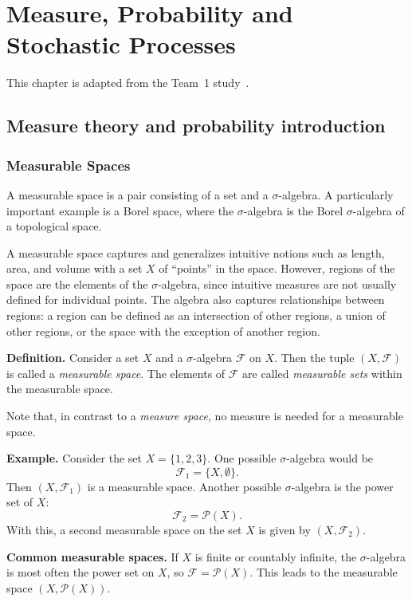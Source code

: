 \chapter{Measure, Probability and Stochastic Processes}
\label{ch:probability}
This chapter is adapted from the Team~1 study~\cite{team1}.

\section{Measure theory and probability introduction}
\subsection{Measurable Spaces}

A measurable space is a pair consisting of a set and a $\sigma$-algebra.
A particularly important example is a Borel space, where the $\sigma$-algebra is the Borel $\sigma$-algebra of a topological space.

\par
A measurable space captures and generalizes intuitive notions such as length, area, and volume with a set $X$ of ``points'' in the space. However, regions of the space are the elements of the $\sigma$-algebra, since intuitive measures are not usually defined for individual points. The algebra also captures relationships between regions: a region can be defined as an intersection of other regions, a union of other regions, or the space with the exception of another region.

\par
\textbf{Definition.} Consider a set $X$ and a $\sigma$-algebra $\mathcal{F}$ on $X$. Then the tuple $(X, \mathcal{F})$ is called a \textit{measurable space}. The elements of $\mathcal{F}$ are called \textit{measurable sets} within the measurable space.

\par
Note that, in contrast to a \textit{measure space}, no measure is needed for a measurable space.

\par
\textbf{Example.} Consider the set $X = \{1, 2, 3\}$. One possible $\sigma$-algebra would be 
\[
\mathcal{F}_1 = \{ X, \emptyset \}.
\]
Then $(X, \mathcal{F}_1)$ is a measurable space. Another possible $\sigma$-algebra is the power set of $X$:
\[
\mathcal{F}_2 = \mathcal{P}(X).
\]
With this, a second measurable space on the set $X$ is given by $(X, \mathcal{F}_2)$.

\par
\textbf{Common measurable spaces.}  
If $X$ is finite or countably infinite, the $\sigma$-algebra is most often the power set on $X$, so $\mathcal{F} = \mathcal{P}(X)$. This leads to the measurable space $(X, \mathcal{P}(X))$.

